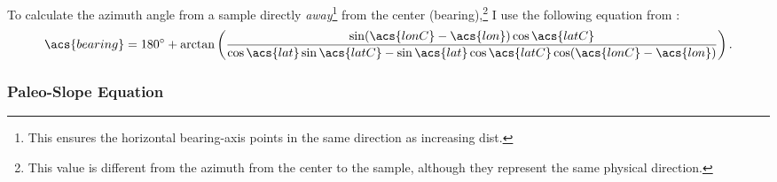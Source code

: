 To calculate the azimuth angle from a sample directly \emph{away}\footnote{This ensures the horizontal \acs{bearing}-axis points in the same direction as increasing \acs{dist}.} from the center (\acs{bearing}),\footnote{This value is different from the azimuth from the center to the sample, although they represent the same physical direction.} I use the following equation from \textcite{williams_aviation, veness_calculate}:
\begin{equation}
    \acs{bearing} = \ang{180} + \arctan\left(\frac{\sin(\acs{lonC}-\acs{lon})\cos\acs{latC}} {\cos\acs{lat} \sin\acs{latC}-\sin\acs{lat}\cos\acs{latC}\cos(\acs{lonC}-\acs{lon})}\right).\label{eq:bearing}
\end{equation} 

\subsubsection{Paleo-Slope Equation}\label{sec:paleo-slope}

